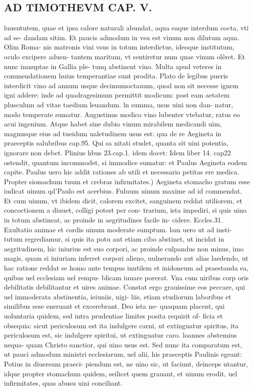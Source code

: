 \documentclass{article}
\begin{document}
\begin{pages}
\section*{AD TIMOTHEVM CAP. V. }
\marginpar{[ p.117 ]}\pstart luuentutem, quae et ipsa calore naturali abundat, aqua eaque interdum cocta, vti ad se- dandam sitim. Et paucis admodum in vsu est vinum non dilutum aqua. Olim Roma- nis matronis vini vsus in totum interdictus, ideoque institutum, oculo excipere aduen- tantem maritum, vt sentiretur num quae vinum olêret. Et nunc imnuptae in Gallia ple- tunq abstinent vino. Multa apud veteres in commendationem huius temperantiae sunt prodita. Plato de legibus pueris interdicit vino ad annum usque decimumoctauum, quod non sit necesse ignem igni addere: inde ad quadragesimum permittit modicum: post eam aetatem plusculum ad vitae taedium leuandum. ln summa, usus uini non dan- natur, modo temperate sumatur. Augustinus modico vino lubenter vtebatur, ratus eo acui ingenium. Atque habet sine dubio vinum mirabilem medicandi uim, magnusque eius ad tueidum ualetudinem usus est: qua de re Aegineta in praeceptis salubribus cap.95. Qui sa nitati studet, quanta sit uini potentia, ignorare non debet. Plinius hbus 23.cap.1. idem docet: Idem liber 14. cap22 ostendit, quantum incommodet, si immodice sumatur: et Paulus Aegineta eodem capite. Paulus uero hic addit rationes ab utili et necessario petitas ere medica. Propter siomachum tuum et crebras infirmitates.) Aegineta stomacho gratum esse iudicat uinum qd'Paulo est acerbius. Fuluum uinum maxime ad id commendat. Et cum uinum, vt ibidem dicit, calorem excitet, sanguinem reddat utiliorem, et concoctionem a diuuet, colligi potest per con- trarium, ista impediri, si quis uino in totum abstineat, ac proinde in aegritudines facile in- cidere. Eccles.31. Exultatio animae et cordis uinum moderate sumptum. lam uero ut ad insti- tutum regrediamur, si quis ita potu aut etiam cibo abstinet, ut incidat in aegritudinem, hic iniurius est suo corpori, ac proinde culpandus non minus, imo magis, quam si iniuriam inferret corpori alieno, uulnerando aut alias laedendo, ut hac ratione reddat se homo ante tempus inutilem et inidoneum ad praestanda ea, quibus uel ecclesiam uel rempu- blicam iuuare porerat. Vna cum uiribus corp oris debilitatis debilitantur et uires animae. Constat ergo grauissime eos peccare, qui uel immoderata abstinentia, ieiuniis, uigi- liis, etiam studiorum laboribus et similibus sese eneruant et excerebrant. Deo ista ne- quaquam placent, qui uoluntaria quidem, sed intra prudentiae limites posita requirit of- ficia et obsequia: sicut periculosum est ita indulgere carni, ut extinguatur spiritus, ita periculosum est, sic indulgere spiritui, ut extinguatur caro. loannes abstemius nequa- quam Christo sanctior, qui uino usus est. Sed nunc ita comparatum est, ut pauci admodum ministri ecclesiarum, uel alii, his praeceptis Paulinis egeant: Potius in diuersum praeci- piendum est, ne uino sic, ut faciunt, deinceps utantur, idque propter stomachum quidem, seilicet quem grauant, et uinum erodit, uel infirmitates, quas abusu uini conciliant.  \pend

\end{pages}
\end{document}
